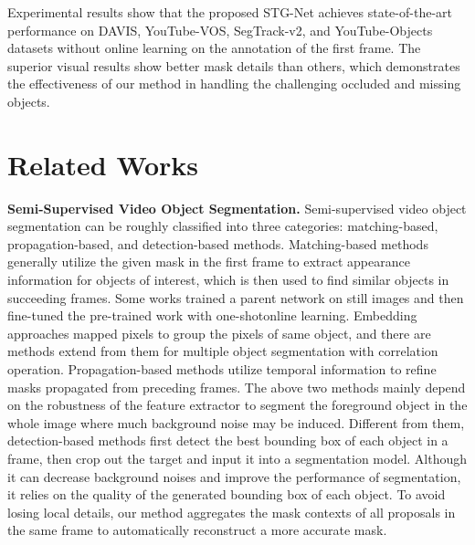 \documentclass[letterpaper]{article} %
\begin{document}
Experimental results show that the proposed STG-Net achieves state-of-the-art performance on DAVIS, YouTube-VOS, SegTrack-v2, and YouTube-Objects datasets without online learning on the annotation of the first frame. The superior visual results show better mask details than others, which demonstrates the effectiveness of our method in handling the challenging occluded and missing objects.

\section{Related Works}
\noindent \textbf{Semi-Supervised Video Object Segmentation.}
Semi-supervised video object segmentation can be roughly classified into three categories: matching-based, propagation-based, and detection-based methods. Matching-based methods \cite{caelles2017one,voigtlaender2017online,zeng2019dmm} generally utilize the given mask in the first frame to extract appearance information for objects of interest, which is then used to find similar objects in succeeding frames.
Some works \cite{caelles2017one,voigtlaender2017online} trained a parent network on still images and then fine-tuned the pre-trained work with one-shotonline learning.
Embedding approaches \cite{chen2018blazingly,hu2018videomatch} mapped pixels to group the pixels of same object, and there are methods \cite{voigtlaender2019feelvos,wang2019ranet} extend from them for multiple object segmentation with correlation operation.
Propagation-based methods \cite{wug2018fast,johnander2019generative,xu2019mhp} utilize temporal information to refine masks propagated from preceding frames.
The above two methods mainly depend on the robustness of the feature extractor to segment the foreground object in the whole image where much background noise may be induced. Different from them, detection-based methods \cite{li2017video,wang2019fast,luiten2018premvos} first detect the best bounding box of each object in a frame, then crop out the target and input it into a segmentation model. Although it can decrease background noises and improve the performance of segmentation, it relies on the quality of the generated bounding box of each object. To avoid losing local details, our method aggregates the mask contexts of all proposals in the same frame to automatically reconstruct a more accurate mask.
\end{document}
